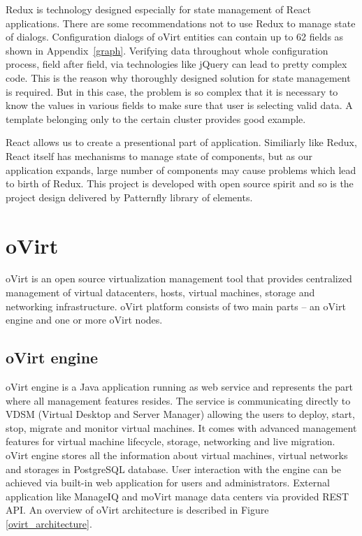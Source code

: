 Redux is technology designed especially for state management of React \cite{React} applications. There are some recommendations not to use Redux \cite{Redux} to manage state of dialogs. Configuration dialogs of oVirt entities can contain up to 62 fields as shown in Appendix~\ref{graph}. Verifying data throughout whole configuration process, field after field, via technologies like jQuery can lead to pretty complex code. This is the reason why thoroughly designed solution for state management is required. But in this case, the problem is so complex that it is necessary to know the values in various fields to make sure that user is selecting valid data. A template belonging only to the certain cluster provides good example.

React allows us to create a presentional part of application. Similiarly like Redux, React itself has mechanisms to manage state of components, but as our application expands, large number of components may cause problems which lead to birth of Redux. This project is developed with open source spirit and so is the project design delivered by Patternfly \cite{Patternfly} library of elements.

\chapter{oVirt}
oVirt is an open source virtualization management tool that provides centralized management of virtual datacenters, hosts, virtual machines, storage and networking infrastructure. oVirt platform consists of two main parts -- an oVirt engine and one or more oVirt nodes.


\section{oVirt engine}
oVirt engine is a Java application running as web service and represents the part where all management features resides. The service is communicating directly to VDSM (Virtual Desktop and Server Manager) allowing the users to deploy, start, stop, migrate and monitor virtual machines. It comes with advanced management features for virtual machine lifecycle, storage, networking and live migration. oVirt engine stores all the information about virtual machines, virtual networks and storages in PostgreSQL \cite{postgre} database. User interaction with the engine can be achieved via built-in web application for users and administrators. External application like ManageIQ and moVirt manage data centers via provided REST API. An overview of oVirt architecture is described in Figure \ref{ovirt_architecture}.

